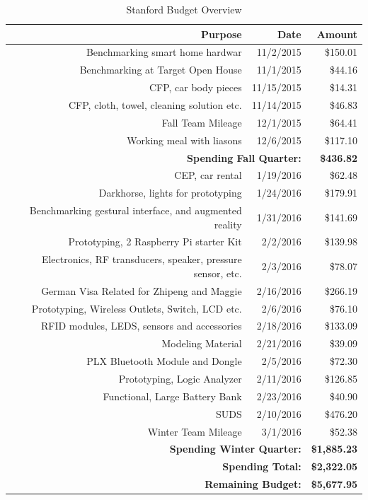 \begin{table}[!ht]
	\centering
		\begin{tabular}{| r | r | r |}
		\hline
		\textbf{Purpose}	& \textbf{Date} & \textbf{Amount} \\
		\hline
		Benchmarking smart home hardwar & 11/2/2015 & \$150.01 \\ \hline
		Benchmarking at Target Open House & 11/1/2015 & \$44.16 \\ \hline
		CFP, car body pieces  & 11/15/2015 & \$14.31 \\ \hline
		CFP, cloth, towel, cleaning solution etc.  & 11/14/2015 & \$46.83 \\ \hline
		Fall Team Mileage   & 12/1/2015 & \$64.41 \\ \hline
		Working meal with liasons  & 12/6/2015 & \$117.10 \\ \hline
        \multicolumn{2}{|r}{\textbf{Spending Fall Quarter:}} & \textbf{\$436.82} \\ \hline
        CEP, car rental & 1/19/2016 & \$62.48 \\ \hline	
        Darkhorse, lights for prototyping & 1/24/2016 & \$179.91 \\ \hline	
        Benchmarking gestural interface, and augmented reality & 1/31/2016 & \$141.69 \\ \hline
        Prototyping, 2 Raspberry Pi starter Kit & 2/2/2016 & \$139.98 \\ \hline	
        Electronics, RF transducers, speaker, pressure sensor, etc. & 2/3/2016 & \$78.07 \\ \hline	
        German Visa Related for Zhipeng and Maggie & 2/16/2016 & \$266.19 \\ \hline
        Prototyping, Wireless Outlets, Switch, LCD etc. & 2/6/2016 & \$76.10 \\ \hline	
        RFID modules, LEDS, sensors and accessories & 2/18/2016 & \$133.09 \\ \hline	
        Modeling Material & 2/21/2016 & \$39.09 \\ \hline
        PLX Bluetooth Module and Dongle & 2/5/2016 & \$72.30 \\ \hline
        Prototyping, Logic Analyzer & 2/11/2016 & \$126.85 \\ \hline
        Functional, Large Battery Bank & 2/23/2016 & \$40.90 \\ \hline
        SUDS & 2/10/2016 & \$476.20 \\ \hline
        Winter Team Mileage & 3/1/2016 & \$52.38 \\ \hline
        \multicolumn{2}{|r}{\textbf{Spending Winter Quarter:}} & \textbf{\$1,885.23} \\ \hline \hline
        \multicolumn{2}{|r}{\textbf{Spending Total:}} & \textbf{\$2,322.05} \\ \hline
        \multicolumn{2}{|r}{\textbf{Remaining Budget:}} & \textbf{\$5,677.95} \\ \hline
	\end{tabular}
	\caption{Stanford Budget Overview }
	\label{tab:budget_stanford}
\end{table}

